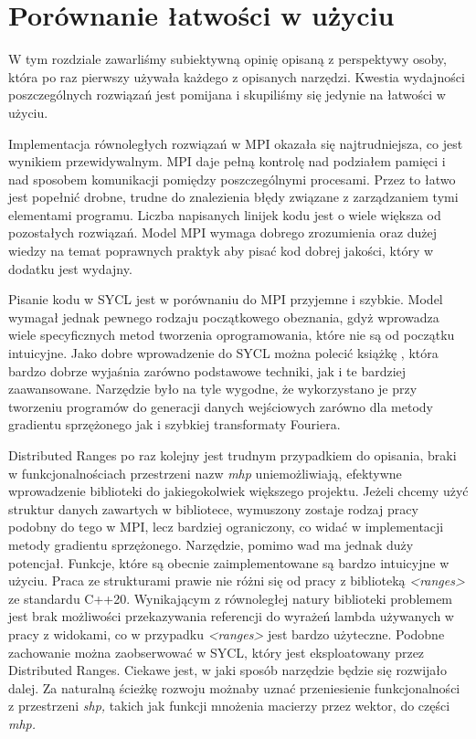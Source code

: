 \documentclass[a4paper,12pt]{book} %
\begin{document}
\chapter{Porównanie łatwości w użyciu}
W tym rozdziale zawarliśmy subiektywną opinię opisaną z perspektywy osoby, która po raz pierwszy używała każdego z opisanych narzędzi. Kwestia wydajności poszczególnych rozwiązań jest pomijana i skupiliśmy się jedynie na łatwości w użyciu.

Implementacja równoległych rozwiązań w MPI okazała się najtrudniejsza, co jest wynikiem przewidywalnym. MPI daje pełną kontrolę nad podziałem pamięci i nad sposobem komunikacji pomiędzy poszczególnymi procesami. Przez to łatwo jest popełnić drobne, trudne do znalezienia błędy związane z zarządzaniem tymi elementami programu. Liczba napisanych linijek kodu jest o wiele większa od pozostałych rozwiązań. Model MPI wymaga dobrego zrozumienia oraz dużej wiedzy na temat poprawnych praktyk aby pisać kod dobrej jakości, który w dodatku jest wydajny.

Pisanie kodu w SYCL jest w porównaniu do MPI przyjemne i szybkie. Model wymagał jednak pewnego rodzaju początkowego obeznania, gdyż wprowadza wiele specyficznych metod tworzenia oprogramowania, które nie są od początku intuicyjne. Jako dobre wprowadzenie do SYCL można polecić książkę \cite{sycl-book}, która bardzo dobrze wyjaśnia zarówno podstawowe techniki, jak i te bardziej zaawansowane. Narzędzie było na tyle wygodne, że wykorzystano je przy tworzeniu programów do generacji danych wejściowych zarówno dla metody gradientu sprzężonego jak i szybkiej transformaty Fouriera.

Distributed Ranges po raz kolejny jest trudnym przypadkiem do opisania, braki w funkcjonalnościach przestrzeni nazw \emph{mhp} uniemożliwiają, efektywne wprowadzenie biblioteki do jakiegokolwiek większego projektu. Jeżeli chcemy użyć struktur danych zawartych w bibliotece, wymuszony zostaje rodzaj pracy podobny do tego w MPI, lecz bardziej ograniczony, co widać w implementacji metody gradientu sprzężonego. Narzędzie, pomimo wad ma jednak duży potencjał. Funkcje, które są obecnie zaimplementowane są bardzo intuicyjne w użyciu. Praca ze strukturami prawie nie różni się od pracy z biblioteką \emph{<ranges>} ze standardu C++20. Wynikającym z równoległej natury biblioteki problemem jest brak możliwości przekazywania referencji do wyrażeń lambda używanych w pracy z widokami, co w przypadku \emph{<ranges>} jest bardzo użyteczne. Podobne zachowanie można zaobserwować w SYCL, który jest eksploatowany przez Distributed Ranges. Ciekawe jest, w jaki sposób narzędzie będzie się rozwijało dalej. Za naturalną ścieżkę rozwoju możnaby uznać przeniesienie funkcjonalności z przestrzeni \emph{shp,} takich jak funkcji mnożenia macierzy przez wektor, do części \emph{mhp.}
\end{document}
